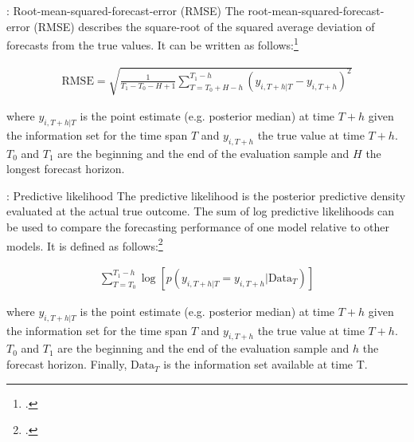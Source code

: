 \begin{frame}{: Root-mean-squared-forecast-error (RMSE)}
    The root-mean-squared-forecast-error (RMSE) describes the square-root of the squared average deviation of forecasts from the true values. It can be written as follows:\footcite{banbura_large_2010}
    
    \begin{align*}
        \text{RMSE} = \sqrt{\frac{1}{T_1 - T_0 - H + 1} \sum_{T = T_0 + H - h}^{T_1 - h} (y_{i , T + h | T} - y_{i , T + h})^2}
    \end{align*}
    
    where $y_{i , T + h | T}$ is the point estimate (e.g. posterior median) at time $T + h$ given the information set for the time span $T$ and $y_{i , T + h}$ the true value at time $T + h$. $T_0$ and $T_1$ are the beginning and the end of the evaluation sample and $H$ the longest forecast horizon.
\end{frame}

\begin{frame}{: Predictive likelihood}
    The predictive likelihood is the posterior predictive density evaluated at the actual true outcome. The sum of log predictive likelihoods can be used to compare the forecasting performance of one model relative to other models. It is defined as follows:\footcite{koop_forecasting_2013}
    
    \begin{align*}
        \sum_{T = T_0}^{T_1 - h} \log [ p(y_{i , T + h | T} = y_{i , T + h} | \text{Data}_T) ]
    \end{align*}
    
    where $y_{i , T + h | T}$ is the point estimate (e.g. posterior median) at time $T + h$ given the information set for the time span $T$ and $y_{i , T + h}$ the true value at time $T + h$. $T_0$ and $T_1$ are the beginning and the end of the evaluation sample and $h$ the forecast horizon. Finally, $\text{Data}_T$ is the information set available at time T. 
\end{frame}

